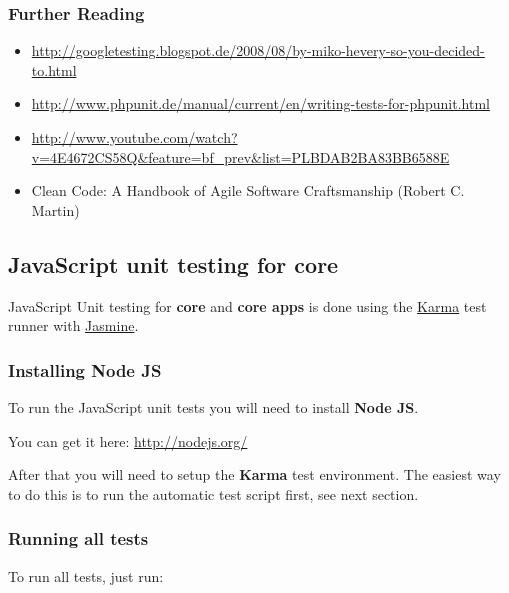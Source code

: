 \documentclass[letterpaper,10pt,english]{sphinxmanual}
\begin{document}
\subsubsection{Further Reading}
\label{core/unit-testing:further-reading}\begin{itemize}
\item {} 
\href{http://googletesting.blogspot.de/2008/08/by-miko-hevery-so-you-decided-to.html}{http://googletesting.blogspot.de/2008/08/by-miko-hevery-so-you-decided-to.html}

\item {} 
\href{http://www.phpunit.de/manual/current/en/writing-tests-for-phpunit.html}{http://www.phpunit.de/manual/current/en/writing-tests-for-phpunit.html}

\item {} 
\href{http://www.youtube.com/watch?v=4E4672CS58Q\&feature=bf\_prev\&list=PLBDAB2BA83BB6588E}{http://www.youtube.com/watch?v=4E4672CS58Q\&feature=bf\_prev\&list=PLBDAB2BA83BB6588E}

\item {} 
Clean Code: A Handbook of Agile Software Craftsmanship (Robert C. Martin)

\end{itemize}


\subsection{JavaScript unit testing for core}
\label{core/unit-testing:javascript-unit-testing-for-core}
JavaScript Unit testing for \textbf{core} and \textbf{core apps} is done using the \href{http://karma-runner.github.io}{Karma} test runner with \href{http://pivotal.github.io/jasmine/}{Jasmine}.


\subsubsection{Installing Node JS}
\label{core/unit-testing:installing-node-js}
To run the JavaScript unit tests you will need to install \textbf{Node JS}.

You can get it here: \href{http://nodejs.org/}{http://nodejs.org/}

After that you will need to setup the \textbf{Karma} test environment.
The easiest way to do this is to run the automatic test script first, see next section.


\subsubsection{Running all tests}
\label{core/unit-testing:running-all-tests}
To run all tests, just run:
\end{document}
